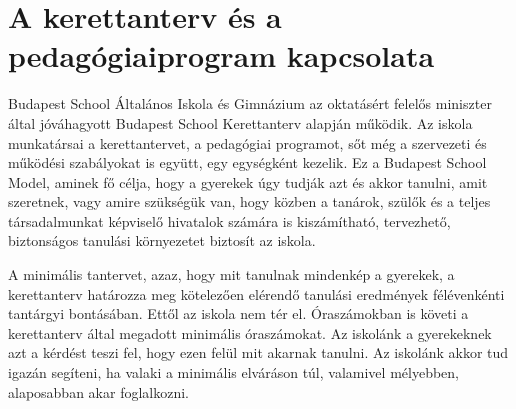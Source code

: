 \section{A kerettanterv és a pedagógiai\hfill\break program  kapcsolata}
\label{sec:tanterv-program}
Budapest School Általános Iskola és Gimnázium az oktatásért felelős miniszter által jóváhagyott Budapest School Kerettanterv alapján működik. Az iskola munkatársai a kerettantervet, a pedagógiai programot, sőt még a szervezeti és működési szabályokat is együtt, egy egységként kezelik. Ez a Budapest School Model, aminek fő célja, hogy a gyerekek úgy tudják azt és akkor tanulni, amit szeretnek, vagy amire szükségük van, hogy közben a tanárok, szülők és a teljes társadalmunkat képviselő hivatalok számára is kiszámítható, tervezhető, biztonságos tanulási környezetet biztosít az iskola.

A minimális tantervet, azaz, hogy mit tanulnak mindenkép a gyerekek, a kerettanterv határozza meg kötelezően elérendő tanulási eredmények félévenkénti tantárgyi bontásában. Ettől az iskola nem tér el. Óraszámokban is követi a kerettanterv által megadott minimális óraszámokat. Az iskolánk a gyerekeknek azt a kérdést teszi fel, hogy ezen felül mit akarnak tanulni. Az iskolánk akkor tud igazán segíteni, ha valaki a minimális elváráson túl, valamivel mélyebben, alaposabban akar foglalkozni.
